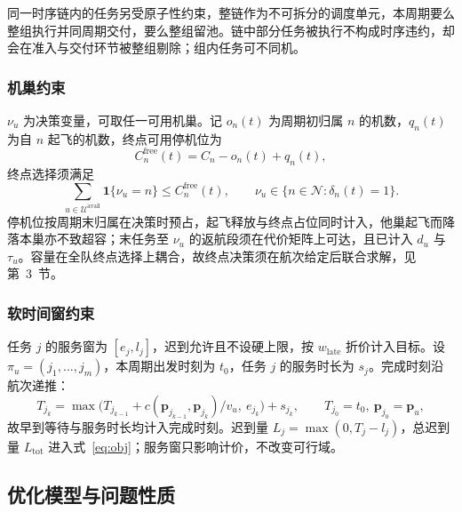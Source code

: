 同一时序链内的任务另受原子性约束，整链作为不可拆分的调度单元，本周期要么整组执行并同周期交付，要么整组留池。链中部分任务被执行不构成时序违约，却会在准入与交付环节被整组剔除；组内任务可不同机。

\subsubsection*{机巢约束}

$\nu_u$ 为决策变量，可取任一可用机巢。记 $o_n(t)$ 为周期初归属 $n$ 的机数，$q_n(t)$ 为自 $n$ 起飞的机数，终点可用停机位为
\begin{equation}
      C_n^{\mathrm{free}}(t)=C_n-o_n(t)+q_n(t),
      \label{eq:free_slot}
\end{equation}
终点选择须满足
\begin{equation}
      \sum_{u\in\mathcal{U}^{\mathrm{avail}}} \mathbf{1}\{\nu_u = n\}
      \le C_n^{\mathrm{free}}(t),
      \qquad
      \nu_u \in \{n\in\mathcal{N}:\delta_n(t)=1\}.
      \label{eq:nest_cap}
\end{equation}
停机位按周期末归属在决策时预占，起飞释放与终点占位同时计入，他巢起飞而降落本巢亦不致超容；末任务至 $\nu_u$ 的返航段须在代价矩阵上可达，且已计入 $d_u$ 与 $\tau_u$。容量在全队终点选择上耦合，故终点决策须在航次给定后联合求解，见第~3~节。

\subsubsection*{软时间窗约束}

任务 $j$ 的服务窗为 $[e_j,l_j]$，迟到允许且不设硬上限，按 $w_{\mathrm{late}}$ 折价计入目标。设 $\pi_u=(j_1,\dots,j_m)$，本周期出发时刻为 $t_0$，任务 $j$ 的服务时长为 $s_j$。完成时刻沿航次递推：
\begin{equation}
      T_{j_k}=\max\!\bigl(T_{j_{k-1}}+c(\bm{p}_{j_{k-1}},\bm{p}_{j_k})/v_u,\ e_{j_k}\bigr)+s_{j_k},
      \qquad T_{j_0}=t_0,\ \bm{p}_{j_0}=\bm{p}_u,
      \label{eq:completion}
\end{equation}
故早到等待与服务时长均计入完成时刻。迟到量 $L_j=\max(0,T_j-l_j)$，总迟到量 $L_{\mathrm{tot}}$ 进入式~\eqref{eq:obj}；服务窗只影响计价，不改变可行域。

\subsection{优化模型与问题性质}

